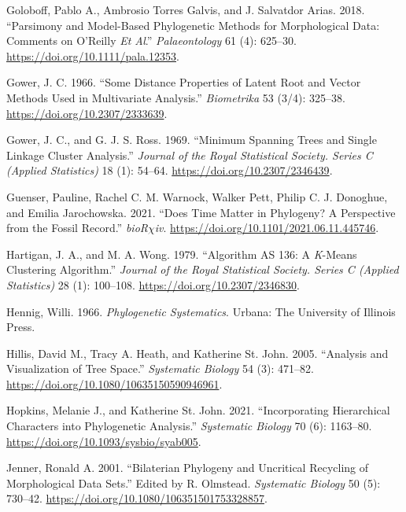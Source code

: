 \begin{CSLReferences}{1}{0}
\leavevmode{}%
Goloboff, Pablo A., Ambrosio Torres Galvis, and J. Salvatdor Arias. 2018. {``Parsimony and Model-Based Phylogenetic Methods for Morphological Data: Comments on {O}'{Reilly} \emph{Et Al}.''} \emph{Palaeontology} 61 (4): 625--30. \url{https://doi.org/10.1111/pala.12353}.

\leavevmode{}%
Gower, J. C. 1966. {``Some Distance Properties of Latent Root and Vector Methods Used in Multivariate Analysis.''} \emph{Biometrika} 53 (3/4): 325--38. \url{https://doi.org/10.2307/2333639}.

\leavevmode{}%
Gower, J. C., and G. J. S. Ross. 1969. {``Minimum Spanning Trees and Single Linkage Cluster Analysis.''} \emph{Journal of the Royal Statistical Society. Series C (Applied Statistics)} 18 (1): 54--64. \url{https://doi.org/10.2307/2346439}.

\leavevmode{}%
Guenser, Pauline, Rachel C. M. Warnock, Walker Pett, Philip C. J. Donoghue, and Emilia Jarochowska. 2021. {``Does Time Matter in Phylogeny? A Perspective from the Fossil Record.''} \emph{bioR{\(\chi\)}iv}. \url{https://doi.org/10.1101/2021.06.11.445746}.

\leavevmode{}%
Hartigan, J. A., and M. A. Wong. 1979. {``Algorithm {AS} 136: A {\emph{K}}-Means Clustering Algorithm.''} \emph{Journal of the Royal Statistical Society. Series C (Applied Statistics)} 28 (1): 100--108. \url{https://doi.org/10.2307/2346830}.

\leavevmode{}%
Hennig, Willi. 1966. \emph{Phylogenetic Systematics}. {Urbana}: {The University of Illinois Press}.

\leavevmode{}%
Hillis, David M., Tracy A. Heath, and Katherine St. John. 2005. {``Analysis and Visualization of Tree Space.''} \emph{Systematic Biology} 54 (3): 471--82. \url{https://doi.org/10.1080/10635150590946961}.

\leavevmode{}%
Hopkins, Melanie J., and Katherine St. John. 2021. {``Incorporating Hierarchical Characters into Phylogenetic Analysis.''} \emph{Systematic Biology} 70 (6): 1163--80. \url{https://doi.org/10.1093/sysbio/syab005}.

\leavevmode{}%
Jenner, Ronald A. 2001. {``Bilaterian Phylogeny and Uncritical Recycling of Morphological Data Sets.''} Edited by R. Olmstead. \emph{Systematic Biology} 50 (5): 730--42. \url{https://doi.org/10.1080/106351501753328857}.


\end{CSLReferences}
